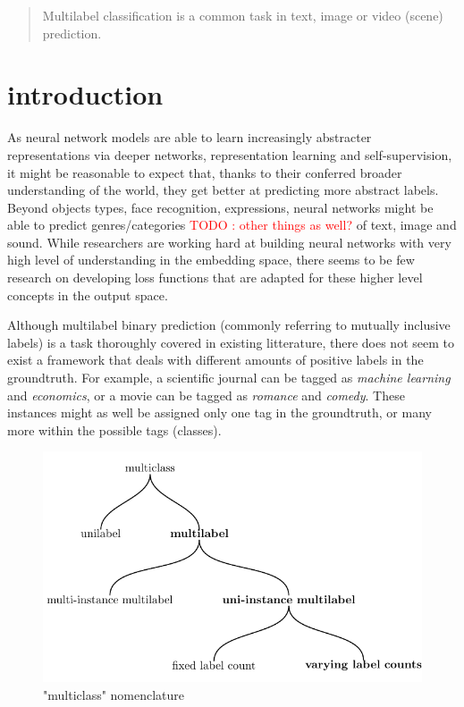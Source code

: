 \documentclass[sigconf,natbib,screen=true,review=true,anonymous]{acmart}
\newcommand\todo[1]{\textcolor{red}{TODO : #1}}
\begin{document}
\begin{abstract}
Multilabel classification is a common task in text, image or video (scene) prediction.
\end{abstract}



\maketitle

\acresetall

\section{introduction}
\label{sec:orgaefff51}

As neural network models are able to learn increasingly abstracter representations via deeper networks, representation learning and self-supervision, it might be reasonable to expect that, thanks to their conferred broader understanding of the world, they get better at predicting more abstract labels. Beyond objects types, face recognition, expressions, neural networks might be able to predict genres/categories \todo{other things as well?} of text, image and sound. While researchers are working hard at building neural networks with very high level of understanding in the embedding space, there seems to be few research on developing loss functions that are adapted for these higher level concepts in the output space.

Although multilabel binary prediction (commonly referring to mutually inclusive labels) is a task thoroughly covered in existing litterature, there does not seem to exist a framework that deals with different amounts of positive labels in the groundtruth. For example, a scientific journal can be tagged as \emph{machine learning} and \emph{economics}, or a movie can be tagged as \emph{romance} and \emph{comedy}. These instances might as well be assigned only one tag in the groundtruth, or many more within the possible tags (classes).

\begin{figure}[htbp]
\centering
\includegraphics[width=.9\linewidth]{./tree/Tree.pdf}
\caption{\label{fig:tree}
"multiclass" nomenclature}
\end{figure}
\end{document}
